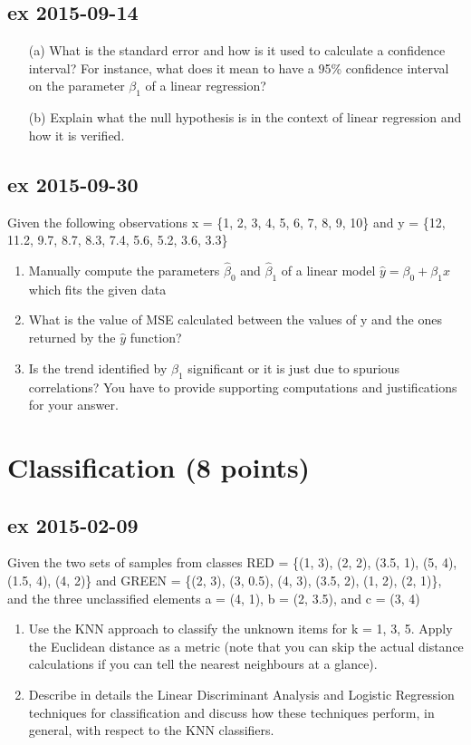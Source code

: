 \documentclass[a4paper,12pt,titlepage]{article} %
\begin{document}
\subsection{ex 2015-09-14}
\begin{itemize}
\item[(a)] What is the standard error and how is it used to calculate a confidence interval? For instance, what does it mean to have a 95\% confidence interval on the parameter $ \beta_{1} $ of a linear regression?
\item[(b)] Explain what the null hypothesis is in the context of linear regression and how it is
verified.
\end{itemize}

\subsection{ex 2015-09-30}
Given the following observations x = \{1, 2, 3, 4, 5, 6, 7, 8, 9, 10\} and y = \{12, 11.2, 9.7, 8.7, 8.3, 7.4, 5.6, 5.2, 3.6, 3.3\}
\begin{enumerate}
\item Manually compute the parameters $ \hat{\beta}_{0} $ and $ \hat{\beta}_{1} $ of a linear model $ \hat{y} = \beta_{0} + \beta_{1} x $ which fits the given data
\item What is the value of MSE calculated between the values of y and the ones returned by the $ \hat{y} $ function?
\item Is the trend identified by $ \hat{\beta}_{1} $ significant or it is just due to spurious correlations? You have to provide supporting computations and justifications for your answer. 
\end{enumerate}

\section{Classification (8 points)}
\subsection{ex 2015-02-09}
Given the two sets of samples from classes RED = \{(1, 3), (2, 2), (3.5, 1), (5, 4), (1.5, 4), (4, 2)\} and GREEN = \{(2, 3), (3, 0.5), (4, 3), (3.5, 2), (1, 2), (2, 1)\}, and the three unclassified elements a = (4, 1), b = (2, 3.5), and c = (3, 4)
\begin{enumerate}
\item Use the KNN approach to classify the unknown items for k = 1, 3, 5. Apply the Euclidean distance as a metric (note that you can skip the actual distance calculations if you can tell the nearest neighbours at a glance).
\item Describe in details the Linear Discriminant Analysis and Logistic Regression techniques for classification and discuss how these techniques perform, in general, with respect to the KNN classifiers.
\end{enumerate}
\end{document}
